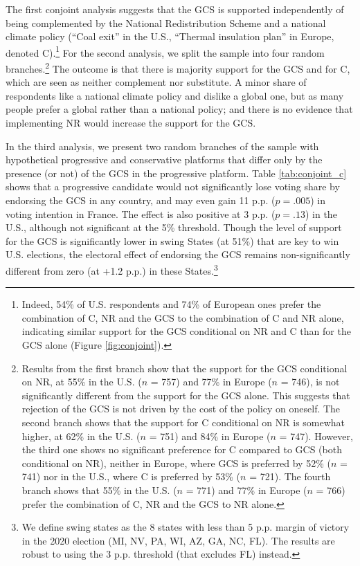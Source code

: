 The first conjoint analysis suggests that the GCS is supported independently of being complemented by the National Redistribution Scheme and a national climate policy (``Coal exit'' in the U.S., ``Thermal insulation plan'' in Europe, denoted C).\footnote{Indeed, 54\% of %
U.S. respondents and 74\% of %
European ones prefer the combination of C, NR and the GCS to the combination of C and NR alone, indicating similar support for the GCS conditional on NR and C than for the GCS alone (Figure \ref{fig:conjoint}).} %
For the second analysis, we split the sample into four random branches.\footnote{Results from the first branch show that the support for the GCS conditional on NR, at 55\% in the U.S. ($n$ = 757) and 77\% in Europe ($n$ = 746), is not significantly different from the support for the GCS alone. This suggests that rejection of the GCS is not driven by the cost of the policy on oneself. The second branch shows that the support for C conditional on NR is somewhat higher, at 62\% in the U.S. ($n$ = 751) and 84\% in Europe ($n$ = 747). However, the third one shows no significant preference for C compared to GCS (both conditional on NR), neither in Europe, where GCS is preferred by 52\% ($n$ = 741) nor in the U.S., where C is preferred by 53\% ($n$ = 721). The fourth branch shows that 55\% in the U.S. ($n$ = 771) and 77\% in Europe ($n$ = 766) prefer the combination of C, NR and the GCS to NR alone.} The outcome is that there is majority support for the GCS and for C, which are seen as neither complement nor substitute. A minor share of respondents like a national climate policy and dislike a global one, but as many people prefer a global rather than a national policy; and there is no evidence that implementing NR would increase the support for the GCS.


In the third analysis, we present two random branches of the sample with hypothetical progressive and conservative platforms that differ only by the presence (or not) of the GCS in the progressive platform. Table \ref{tab:conjoint_c} shows that a progressive candidate would not significantly lose voting share by endorsing the GCS in any country, and may even gain 11 p.p. ($p = .005$) in voting intention in France. The effect is also positive at 3 p.p. ($p = .13$) in the U.S., although not significant at the 5\% threshold. %
Though the level of support for the GCS is significantly lower in swing States (at 51\%) that are key to win U.S. elections, the electoral effect of endorsing the GCS remains non-significantly different from zero (at +1.2 p.p.) in these States.\footnote{We define swing states as the 8 states with less than 5 p.p. margin of victory in the 2020 election (MI, NV, PA, WI, AZ, GA, NC, FL). The results are robust to using the 3 p.p. threshold (that excludes FL) instead.}

